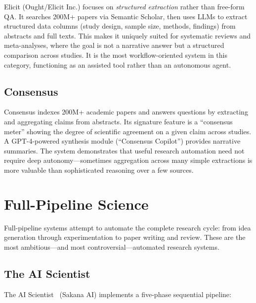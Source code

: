 \documentclass[11pt,a4paper]{article}
\begin{document}
Elicit (Ought/Elicit Inc.) focuses on \emph{structured extraction}
rather than free-form QA. It searches 200M+ papers via Semantic Scholar,
then uses LLMs to extract structured data columns (study design, sample
size, methods, findings) from abstracts and full texts. This makes it
uniquely suited for systematic reviews and meta-analyses, where the goal
is not a narrative answer but a structured comparison across studies.
It is the most workflow-oriented system in this category, functioning
as an assisted tool rather than an autonomous agent.

\subsection{Consensus}

Consensus indexes 200M+ academic papers and answers questions by
extracting and aggregating claims from abstracts. Its signature feature
is a ``consensus meter'' showing the degree of scientific agreement on
a given claim across studies. A GPT-4-powered synthesis module
(``Consensus Copilot'') provides narrative summaries. The system
demonstrates that useful research automation need not require deep
autonomy---sometimes aggregation across many simple extractions is
more valuable than sophisticated reasoning over a few sources.

\section{Full-Pipeline Science}
\label{sec:pipeline}

Full-pipeline systems attempt to automate the complete research cycle:
from idea generation through experimentation to paper writing and review.
These are the most ambitious---and most controversial---automated
research systems.

\subsection{The AI Scientist}

The AI Scientist~\citep{aiscientist2024} (Sakana AI) implements a
five-phase sequential pipeline:
\end{document}
